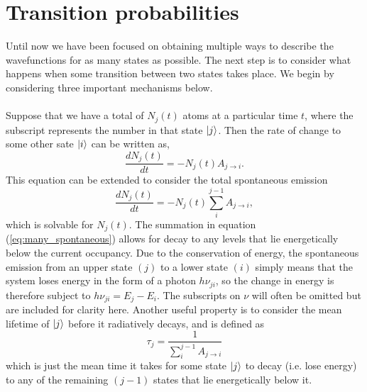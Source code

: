\section{Transition probabilities}\label{sec:many_transition}
Until now we have been focused on obtaining multiple ways to describe the wavefunctions for as many states as possible. The next step is to consider what happens when some transition between two states takes place. We begin by considering three important mechanisms below.\\

\\
Suppose that we have a total of $N_j(t)$ atoms at a particular time $t$, where the subscript represents the number in that state $\Ket{j}$. Then the rate of change to some other sate $\Ket{i}$ can be written as,
\[
\frac{dN_j(t)}{dt} = -N_j(t)A_{j\rightarrow i}.
\]
This equation can be extended to consider the total spontaneous emission
\begin{equation}\label{eq:many_spontaneous}
\frac{d N_j(t)}{dt} = - N_j(t)\sum_i^{j-1}A_{j \rightarrow i},
\end{equation}
which is solvable for $N_j(t)$. The summation in equation (\ref{eq:many_spontaneous}) allows for decay to any levels that lie energetically below the current occupancy. Due to the conservation of energy, the spontaneous emission from an upper state $(j)$ to a lower state $(i)$ simply means that the system loses energy in the form of a photon $h\nu_{ji}$, so the change in energy is therefore subject to $h\nu_{ji} = E_j - E_i$. The subscripts on $\nu$ will often be omitted but are included for clarity here. Another useful property is to consider the mean lifetime of $\Ket{j}$ before it radiatively decays, and is defined as
\[
\tau_j = \frac{1}{\sum_i^{j-1}A_{j \rightarrow i}}
\]
which is just the mean time it takes for some state $\Ket{j}$ to decay (i.e. lose energy) to any of the remaining $(j-1)$ states that lie energetically below it.\\

